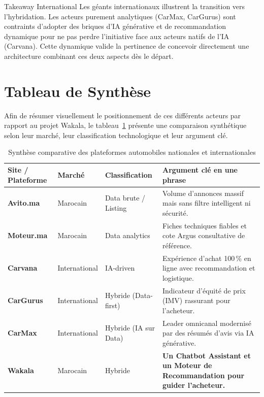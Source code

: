 \documentclass[11pt,a4paper]{article}
\begin{document}
\begin{insightbox}{Takeaway International}
Les géants internationaux illustrent la transition vers l'hybridation. Les acteurs purement analytiques (CarMax, CarGurus) sont contraints d'adopter des briques d'IA générative et de recommandation dynamique pour ne pas perdre l'initiative face aux acteurs natifs de l'IA (Carvana). Cette dynamique valide la pertinence de concevoir directement une architecture combinant ces deux aspects dès le départ.
\end{insightbox}

\newpage

\section{Tableau de Synthèse}

Afin de résumer visuellement le positionnement de ces différents acteurs par rapport au projet Wakala, le tableau~\ref{tab:synthese} présente une comparaison synthétique selon leur marché, leur classification technologique et leur argument clé.

\begin{table}[htbp]
  \centering
  \caption{Synthèse comparative des plateformes automobiles nationales et internationales}
  \label{tab:synthese}
  \vspace{0.3cm}
  \begin{tabular}{llp{3cm}p{6.5cm}}
    \toprule
    \textbf{Site / Plateforme} & \textbf{Marché} & \textbf{Classification} & \textbf{Argument clé en une phrase} \\
    \midrule
    \textbf{Avito.ma} & Marocain & Data brute / Listing & Volume d'annonces massif mais sans filtre intelligent ni sécurité. \\
    \addlinespace
    \textbf{Moteur.ma} & Marocain & Data analytics & Fiches techniques fiables et cote Argus consultative de référence. \\
    \addlinespace
    \textbf{Carvana} & International & IA-driven & Expérience d'achat 100\,\% en ligne avec recommandation et logistique. \\
    \addlinespace
    \textbf{CarGurus} & International & Hybride (Data-first) & Indicateur d'équité de prix (IMV) rassurant pour l'acheteur. \\
    \addlinespace
    \textbf{CarMax} & International & Hybride (IA sur Data) & Leader omnicanal modernisé par des résumés d'avis via IA générative. \\
    \addlinespace
    \midrule
    \textbf{Wakala} & Marocain & Hybride & \textbf{Un Chatbot Assistant et un Moteur de Recommandation pour guider l'acheteur.} \\
    \bottomrule
  \end{tabular}
\end{table}
\end{document}

